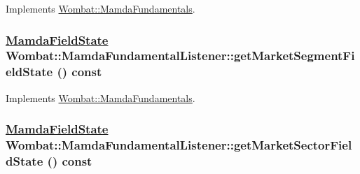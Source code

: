 Implements \hyperlink{classWombat_1_1MamdaFundamentals_4baa69aa9248171d05776310b583db7e}{Wombat::Mamda\-Fundamentals}.\hypertarget{classWombat_1_1MamdaFundamentalListener_5fafb7554fa5481acfb2898b8eec29ae}{
\subsubsection[getMarketSegmentFieldState]{\setlength{\rightskip}{0pt plus 5cm}\hyperlink{namespaceWombat_93aac974f2ab713554fd12a1fa3b7d2a}{Mamda\-Field\-State} Wombat::Mamda\-Fundamental\-Listener::get\-Market\-Segment\-Field\-State () const}}
\label{classWombat_1_1MamdaFundamentalListener_5fafb7554fa5481acfb2898b8eec29ae}




Implements \hyperlink{classWombat_1_1MamdaFundamentals_d80a02902e1682818f3030af747e68ad}{Wombat::Mamda\-Fundamentals}.\hypertarget{classWombat_1_1MamdaFundamentalListener_4cb742287269d90b2e1484c30d995a6f}{
\subsubsection[getMarketSectorFieldState]{\setlength{\rightskip}{0pt plus 5cm}\hyperlink{namespaceWombat_93aac974f2ab713554fd12a1fa3b7d2a}{Mamda\-Field\-State} Wombat::Mamda\-Fundamental\-Listener::get\-Market\-Sector\-Field\-State () const}}
\label{classWombat_1_1MamdaFundamentalListener_4cb742287269d90b2e1484c30d995a6f}




